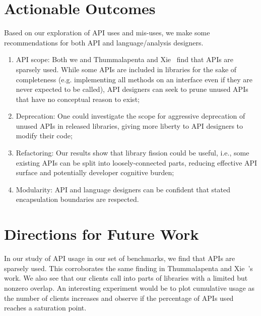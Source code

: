 \section{Actionable Outcomes}
Based on our exploration of API uses and mis-uses, we make some recommendations
for both API and language/analysis designers.

\begin{enumerate}
\item API scope: Both we and Thummalapenta and Xie~\cite{thummalapenta08:_spotw} find
that APIs are sparsely used. While some APIs are included in libraries for the sake of completeness (e.g. implementing all methods on an interface even if they are never expected to be called), API designers can seek to prune  unused APIs that have no conceptual reason to exist; 
\item Deprecation: One could investigate the scope for aggressive deprecation of unused APIs in released libraries, giving more liberty to API designers to modify their code;
\item Refactoring: Our results show that library fission could be useful, i.e., some existing APIs can be split into loosely-connected parts, reducing effective API surface and potentially developer cognitive burden;
\item Modularity: API and language designers can be confident that stated encapsulation boundaries are respected.
\end{enumerate}


\section{Directions for Future Work}
In our study of API usage in our set of benchmarks, we find that APIs are sparsely used. 
This corroborates the same finding in Thummalapenta and Xie~\cite{thummalapenta08:_spotw}'s work.
We also see that our clients call into parts of libraries with a limited but nonzero overlap. 
An interesting experiment would be to plot cumulative usage as the number of clients increases and observe if the percentage of APIs used reaches a saturation
point.

